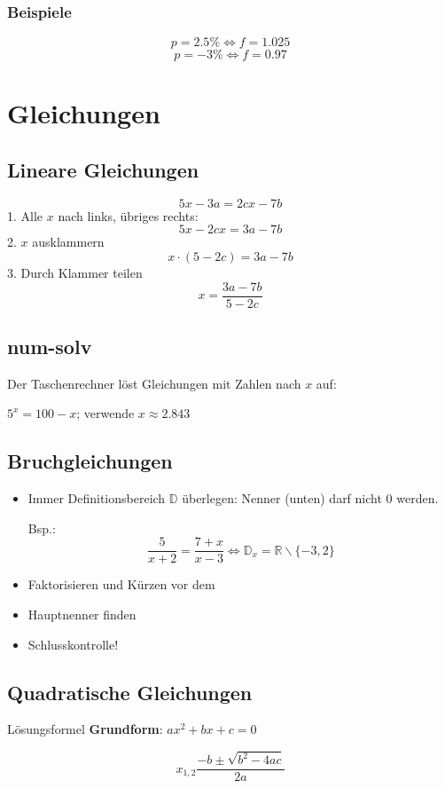 \begin{multicols}{2}
\subsubsection{Beispiele}
$$p = 2.5\% \Longleftrightarrow{} f = 1.025$$
$$p = -3\% \Longleftrightarrow{} f = 0.97$$

\hrulefill
\section{Gleichungen}

\subsection{Lineare Gleichungen}
$$5x-3a = 2cx-7b$$
1. Alle $x$ nach links, übriges rechts:
$$5x - 2cx = 3a-7b$$
2. $x$ ausklammern
$$x\cdot{}(5-2c) = 3a-7b$$
3. Durch Klammer teilen
$$x = \frac{3a-7b}{5-2c}$$


\subsection{num-solv}
Der Taschenrechner löst Gleichungen mit Zahlen nach $x$ auf:

$5^x = 100 -x$; verwende  $x\approx{}2.843$



\subsection{Bruchgleichungen}
\begin{rezept}{}{}
\begin{itemize}
\item
Immer Definitionsbereich $\mathbb{D}$ überlegen: Nenner (unten) darf
nicht 0 werden.

Bsp.: $$\frac5{x+2}=\frac{7+x}{x-3} \Leftrightarrow{} \mathbb{D}_x=\mathbb{R}\backslash{}\{-3, 2\}$$
\item Faktorisieren und Kürzen vor dem
\item Hauptnenner finden
\item Schlusskontrolle!
\end{itemize}
\end{rezept}

\end{multicols}

\subsection{Quadratische Gleichungen}
\begin{gesetz}{Lösungsformel}{}
\textbf{Grundform}: $ax^2 + bx+c = 0$

$$x_{1,2}\frac{-b \pm \sqrt{b^2-4ac}}{2a}$$
\end{gesetz}

